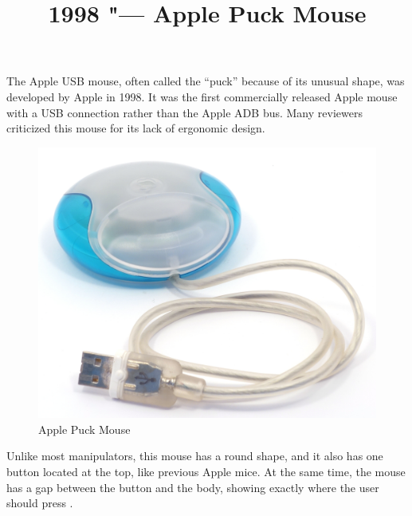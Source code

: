 \documentclass[11pt, a4paper]{article}
\begin{document}
\title{1998 "--- Apple Puck Mouse}
\date{}
\maketitle
The Apple USB mouse, often called the “puck” because of its unusual shape, was developed by Apple in 1998. It was the first commercially released Apple mouse with a USB connection rather than the Apple ADB bus. Many reviewers criticized this mouse for its lack of ergonomic design.

\begin{figure}[h]
    \centering
    \includegraphics[scale=0.8]{1998_apple_puck/apple60.jpg}
    \caption{Apple Puck Mouse}
    \label{fig:pic}
\end{figure}

Unlike most manipulators, this mouse has a round shape, and it also has one button located at the top, like previous Apple mice. At the same time, the mouse has a gap between the button and the body, showing exactly where the user should press \cite{Apple}.
\end{document}
